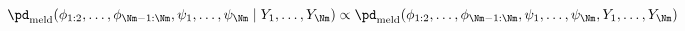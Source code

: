 \begin{equation}
  \pd_{\text{meld}} (\phi_{1:2}, \ldots, \phi_{\Nm - 1:\Nm}, \psi_{1}, \ldots, \psi_{\Nm} \mid Y_{1}, \ldots, Y_{\Nm})
  \propto
  \pd_{\text{meld}} (\phi_{1:2}, \ldots, \phi_{\Nm - 1:\Nm}, \psi_{1}, \ldots, \psi_{\Nm}, Y_{1}, \ldots, Y_{\Nm})
  \label{eqn:melded-posterior}
\end{equation}